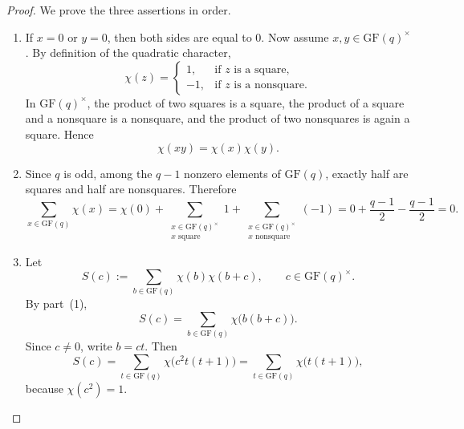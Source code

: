 \documentclass[11pt, a4paper]{ctexrep}
\begin{document}
\begin{proof}
    We prove the three assertions in order.

    \begin{enumerate}
        \item If $x=0$ or $y=0$, then both sides are equal to $0$.
              Now assume $x,y\in \mathrm{GF}(q)^\times$. By definition of the quadratic character,
              \[
                  \chi(z)=
                  \begin{cases}
                      1,  & \text{if } z \text{ is a square},    \\
                      -1, & \text{if } z \text{ is a nonsquare}.
                  \end{cases}
              \]
              In $\mathrm{GF}(q)^\times$, the product of two squares is a square, the product of a square and a nonsquare is a nonsquare, and the product of two nonsquares is again a square. Hence
              \[
                  \chi(xy)=\chi(x)\chi(y).
              \]

        \item Since $q$ is odd, among the $q-1$ nonzero elements of $\mathrm{GF}(q)$, exactly half are squares and half are nonsquares. Therefore
              \[
                  \sum_{x\in \mathrm{GF}(q)} \chi(x)
                  =
                  \chi(0)+\sum_{\substack{x\in \mathrm{GF}(q)^\times\\ x\text{ square}}}1
                  +\sum_{\substack{x\in \mathrm{GF}(q)^\times\\ x\text{ nonsquare}}}(-1)
                  =
                  0+\frac{q-1}{2}-\frac{q-1}{2}=0.
              \]

        \item Let
              \[
                  S(c):=\sum_{b\in \mathrm{GF}(q)}\chi(b)\chi(b+c),
                  \qquad c\in \mathrm{GF}(q)^\times.
              \]
              By part~(1),
              \[
                  S(c)=\sum_{b\in \mathrm{GF}(q)}\chi\bigl(b(b+c)\bigr).
              \]
              Since $c\neq 0$, write $b=ct$. Then
              \[
                  S(c)=\sum_{t\in \mathrm{GF}(q)}\chi\bigl(c^2t(t+1)\bigr)
                  =\sum_{t\in \mathrm{GF}(q)}\chi\bigl(t(t+1)\bigr),
              \]
              because $\chi(c^2)=1$.


\end{enumerate}
\end{proof}
\end{document}
